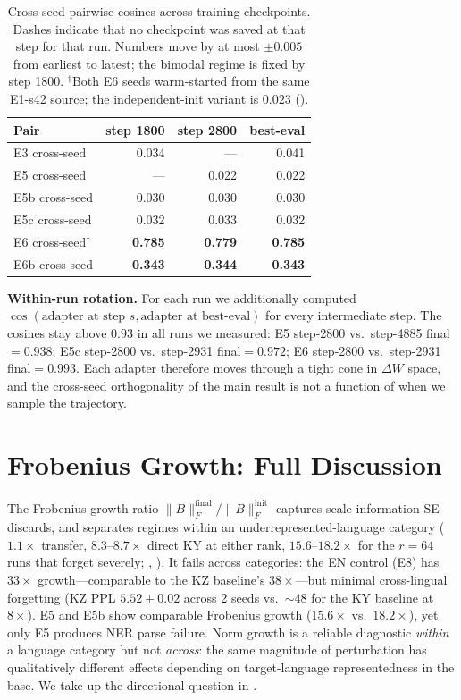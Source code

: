 \documentclass[11pt]{article}
\begin{document}
\begin{table}[!htbp]
\centering
\small
\begin{tabular}{lrrr}
\toprule
\textbf{Pair} & \textbf{step 1800} & \textbf{step 2800} & \textbf{best-eval} \\
\midrule
E3 cross-seed   & 0.034 & ---   & 0.041 \\
E5 cross-seed   & ---   & 0.022 & 0.022 \\
E5b cross-seed  & 0.030 & 0.030 & 0.030 \\
E5c cross-seed  & 0.032 & 0.033 & 0.032 \\
E6 cross-seed$^{\dagger}$ & \textbf{0.785} & \textbf{0.779} & \textbf{0.785} \\
E6b cross-seed  & \textbf{0.343} & \textbf{0.344} & \textbf{0.343} \\
\bottomrule
\end{tabular}
\caption{Cross-seed pairwise cosines across training checkpoints. Dashes indicate that no checkpoint was saved at that step for that run. Numbers move by at most $\pm 0.005$ from earliest to latest; the bimodal regime is fixed by step 1800. $^{\dagger}$Both E6 seeds warm-started from the same E1-s42 source; the independent-init variant is $0.023$ ().}
\label{tab:trajectory}
\end{table}

\textbf{Within-run rotation.} For each run we additionally computed $\cos(\text{adapter at step }s, \text{adapter at best-eval})$ for every intermediate step. The cosines stay above $0.93$ in all runs we measured: E5 step-2800 vs.\ step-4885 final$=0.938$; E5c step-2800 vs.\ step-2931 final$=0.972$; E6 step-2800 vs.\ step-2931 final$=0.993$. Each adapter therefore moves through a tight cone in $\Delta W$ space, and the cross-seed orthogonality of the main result is not a function of when we sample the trajectory.

\FloatBarrier
\section{Frobenius Growth: Full Discussion}
\label{app:frobenius}

The Frobenius growth ratio $\|B\|_F^{\text{final}}/\|B\|_F^{\text{init}}$ captures scale information SE discards, and separates regimes within an underrepresented-language category ($1.1\times$ transfer, $8.3$--$8.7\times$ direct KY at either rank, $15.6$--$18.2\times$ for the $r{=}64$ runs that forget severely; , ). It fails across categories: the EN control (E8) has $33\times$ growth---comparable to the KZ baseline's $38\times$---but minimal cross-lingual forgetting (KZ PPL $5.52 \pm 0.02$ across 2 seeds vs.\ $\sim 48$ for the KY baseline at $8\times$). E5 and E5b show comparable Frobenius growth ($15.6\times$ vs.\ $18.2\times$), yet only E5 produces NER parse failure. Norm growth is a reliable diagnostic \emph{within} a language category but not \emph{across}: the same magnitude of perturbation has qualitatively different effects depending on target-language representedness in the base. We take up the directional question in .
\end{document}
